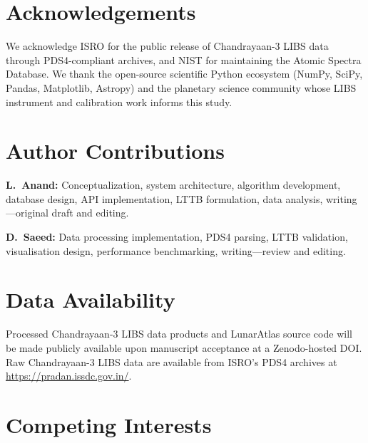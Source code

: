 \documentclass[a4paper,twocolumn,10pt]{article}
\begin{document}
\section*{Acknowledgements}

We acknowledge ISRO for the public release of Chandrayaan-3 LIBS data
through PDS4-compliant archives, and NIST for maintaining the Atomic
Spectra Database.  We thank the open-source scientific Python ecosystem
(NumPy, SciPy, Pandas, Matplotlib, Astropy) and the planetary science
community whose LIBS instrument and calibration work informs this study.


\section*{Author Contributions}

\textbf{L.~Anand:} Conceptualization, system architecture, algorithm
development, database design, API implementation, LTTB formulation,
data analysis, writing---original draft and editing.

\textbf{D.~Saeed:} Data processing implementation, PDS4 parsing,
LTTB validation, visualisation design, performance benchmarking,
writing---review and editing.


\section*{Data Availability}

Processed Chandrayaan-3 LIBS data products and LunarAtlas source code
will be made publicly available upon manuscript acceptance at a
Zenodo-hosted DOI.  Raw Chandrayaan-3 LIBS data are available from
ISRO's PDS4 archives at \url{https://pradan.issdc.gov.in/}.


\section*{Competing Interests}
\end{document}
